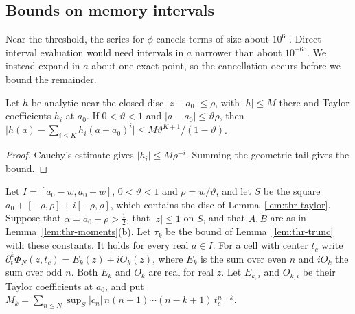 \subsection{Bounds on memory intervals}

Near the threshold, the series for $\phi$ cancels terms of size
about $10^{60}$. Direct interval evaluation would need intervals
in $a$ narrower than about $10^{-65}$. We instead expand in $a$
about one exact point, so the cancellation occurs before we bound
the remainder.

\begin{lemma}\label{lem:thr-taylor}
Let $h$ be analytic near the closed disc $\lvert z-a_0\rvert\le\rho$, with
$\lvert h\rvert\le M$ there and Taylor coefficients $h_i$ at $a_0$. If $0<\vartheta<1$
and $\lvert a-a_0\rvert\le \vartheta\rho$, then
$\lvert h(a)-\sum_{i\le K}h_i(a-a_0)^i\rvert\le M\vartheta^{K+1}/(1-\vartheta)$.
\end{lemma}

\begin{proof}
Cauchy's estimate gives $\lvert h_i\rvert\le M\rho^{-i}$. Summing the geometric
tail gives the bound.
\end{proof}

Let $I=[a_0-w,a_0+w]$, $0<\vartheta<1$ and $\rho=w/\vartheta$, and let $S$ be the square
$a_0+[-\rho,\rho]+i[-\rho,\rho]$, which contains the disc of
Lemma~\ref{lem:thr-taylor}. Suppose that $\alpha=a_0-\rho>\frac12$, that
$\lvert z\rvert\le1$ on $S$, and that $\tilde A,\tilde B$ are as in
Lemma~\ref{lem:thr-moments}(b). Let $\tau_k$ be the bound of
Lemma~\ref{lem:thr-trunc} with these constants. It holds for every real
$a\in I$. For a cell with center $t_c$ write
$\partial_t^k\Phi_N(z,t_c)=E_k(z)+iO_k(z)$, where $E_k$ is the sum over even
$n$ and $iO_k$ the sum over odd $n$. Both $E_k$ and $O_k$ are real for real
$z$. Let $E_{k,i}$ and $O_{k,i}$ be their Taylor coefficients at $a_0$, and
put $M_k=\sum_{n\le N}\sup_S\lvert c_n\rvert\,n(n-1)\cdots(n-k+1)\,t_c^{n-k}$.


